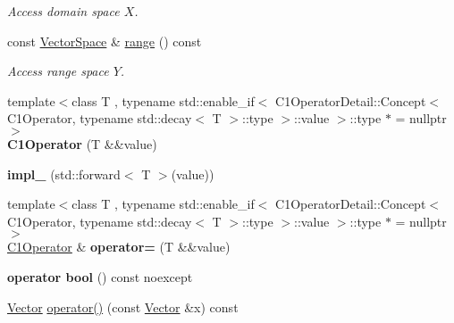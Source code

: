 \begin{DoxyCompactItemize}
\begin{DoxyCompactList}\small\item\em Access domain space $X$. \end{DoxyCompactList}\item 
\hypertarget{classSpacy_1_1C1Operator_a7df27427591907b13776e7ba3707bf05}{const \hyperlink{classSpacy_1_1VectorSpace}{Vector\-Space} \& \hyperlink{classSpacy_1_1C1Operator_a7df27427591907b13776e7ba3707bf05}{range} () const }\label{classSpacy_1_1C1Operator_a7df27427591907b13776e7ba3707bf05}

\begin{DoxyCompactList}\small\item\em Access range space $Y$. \end{DoxyCompactList}\item 
\hypertarget{classSpacy_1_1C1Operator_a9a46e9d2fb4526fa320480b832c5b71e}{{\footnotesize template$<$class T , typename std\-::enable\-\_\-if$<$ C1\-Operator\-Detail\-::\-Concept$<$ C1\-Operator, typename std\-::decay$<$ T $>$\-::type $>$\-::value $>$\-::type $\ast$  = nullptr$>$ }\\{\bfseries C1\-Operator} (T \&\&value)}\label{classSpacy_1_1C1Operator_a9a46e9d2fb4526fa320480b832c5b71e}

\item 
\hypertarget{classSpacy_1_1C1Operator_ae4068d2989e5aa71b372def134afdd78}{{\bfseries impl\-\_\-} (std\-::forward$<$ T $>$(value))}\label{classSpacy_1_1C1Operator_ae4068d2989e5aa71b372def134afdd78}

\item 
\hypertarget{classSpacy_1_1C1Operator_aecfc71bf5da728a9028a586e50afbfcf}{{\footnotesize template$<$class T , typename std\-::enable\-\_\-if$<$ C1\-Operator\-Detail\-::\-Concept$<$ C1\-Operator, typename std\-::decay$<$ T $>$\-::type $>$\-::value $>$\-::type $\ast$  = nullptr$>$ }\\\hyperlink{classSpacy_1_1C1Operator}{C1\-Operator} \& {\bfseries operator=} (T \&\&value)}\label{classSpacy_1_1C1Operator_aecfc71bf5da728a9028a586e50afbfcf}

\item 
\hypertarget{classSpacy_1_1C1Operator_a4efdf099aac5f0b101c69cc8c9c8a48b}{{\bfseries operator bool} () const noexcept}\label{classSpacy_1_1C1Operator_a4efdf099aac5f0b101c69cc8c9c8a48b}

\item 
\hypertarget{classSpacy_1_1C1Operator_a2a01bf08bf2b6e44955cd606aa3db91d}{\hyperlink{classSpacy_1_1Vector}{Vector} \hyperlink{classSpacy_1_1C1Operator_a2a01bf08bf2b6e44955cd606aa3db91d}{operator()} (const \hyperlink{classSpacy_1_1Vector}{Vector} \&x) const }\label{classSpacy_1_1C1Operator_a2a01bf08bf2b6e44955cd606aa3db91d}


\end{DoxyCompactItemize}
